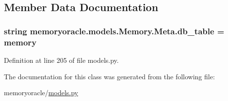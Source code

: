 \subsection{Member Data Documentation}
\hypertarget{classmemoryoracle_1_1models_1_1Memory_1_1Meta_a4a165802fdb1a8e2643aba9d59e91cf4}{}
\subsubsection[{db\+\_\+table}]{\setlength{\rightskip}{0pt plus 5cm}string memoryoracle.\+models.\+Memory.\+Meta.\+db\+\_\+table = \textquotesingle{}memory\textquotesingle{}\hspace{0.3cm}{\ttfamily [static]}}\label{classmemoryoracle_1_1models_1_1Memory_1_1Meta_a4a165802fdb1a8e2643aba9d59e91cf4}


Definition at line 205 of file models.\+py.



The documentation for this class was generated from the following file\+:\begin{DoxyCompactItemize}
\item 
memoryoracle/\hyperlink{models_8py}{models.\+py}\end{DoxyCompactItemize}
